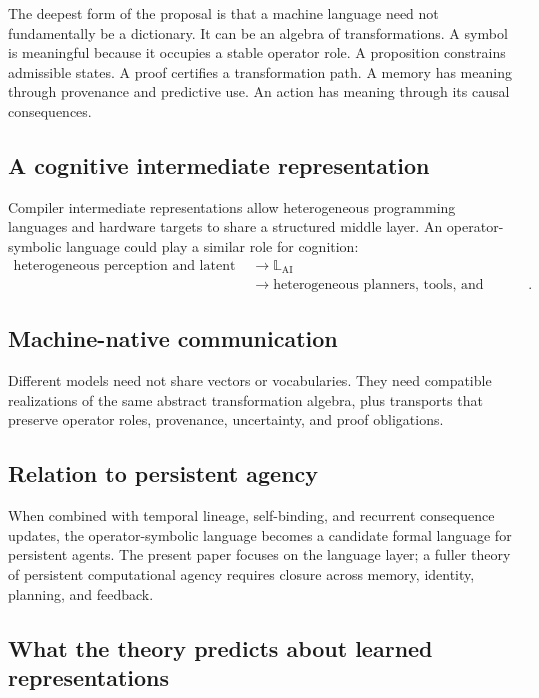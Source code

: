 \documentclass[11pt]{article}
\theoremstyle{definition}
\theoremstyle{remark}
\newcommand{\LangAI}{\mathbb L_{\mathrm{AI}}}
\begin{document}
The deepest form of the proposal is that a machine language need not fundamentally be a dictionary. It can be an algebra of transformations. A symbol is meaningful because it occupies a stable operator role. A proposition constrains admissible states. A proof certifies a transformation path. A memory has meaning through provenance and predictive use. An action has meaning through its causal consequences.

\subsection{A cognitive intermediate representation}

Compiler intermediate representations allow heterogeneous programming languages and hardware targets to share a structured middle layer. An operator-symbolic language could play a similar role for cognition:
\[
\begin{aligned}
\text{heterogeneous perception and latent models}
&\to
\LangAI\\
&\to
\text{heterogeneous planners, tools, and actuators}.
\end{aligned}
\]

\subsection{Machine-native communication}

Different models need not share vectors or vocabularies. They need compatible realizations of the same abstract transformation algebra, plus transports that preserve operator roles, provenance, uncertainty, and proof obligations.

\subsection{Relation to persistent agency}

When combined with temporal lineage, self-binding, and recurrent consequence updates, the operator-symbolic language becomes a candidate formal language for persistent agents. The present paper focuses on the language layer; a fuller theory of persistent computational agency requires closure across memory, identity, planning, and feedback.


\subsection{What the theory predicts about learned representations}
\end{document}

